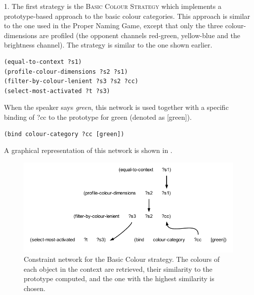 \enlargethispage{1\baselineskip}
1. The first strategy is the {\scshape Basic Colour Strategy} which implements a prototype-based approach to 
the basic colour categories. This approach is similar to the one used in the Proper Naming Game, except that 
only the three colour-dimensions are profiled (the opponent channels red-green, yellow-blue and the brightness channel). 
The strategy is similar to the one shown earlier. 
\begin{verbatim}
(equal-to-context ?s1) 
(profile-colour-dimensions ?s2 ?s1)
(filter-by-colour-lenient ?s3 ?s2 ?cc)
(select-most-activated ?t ?s3)
\end{verbatim}
When the speaker says \textit{green}, this network is used together with a specific binding of ?cc to the prototype for 
green (denoted as [green]). 
\begin{verbatim}
(bind colour-category ?cc [green])
\end{verbatim}
A graphical representation of this network is shown in . 

\begin{figure}[htbp]
  \centerline{\includegraphics[width=1.0\textwidth]{chap11/figs/basic-strat.pdf}}
\caption{\label{fig:basic-strat}Constraint network for the Basic Colour strategy. The colours of each object in the context are retrieved, their 
similarity to the prototype computed, and the one with the highest similarity is chosen.}
\end{figure}

